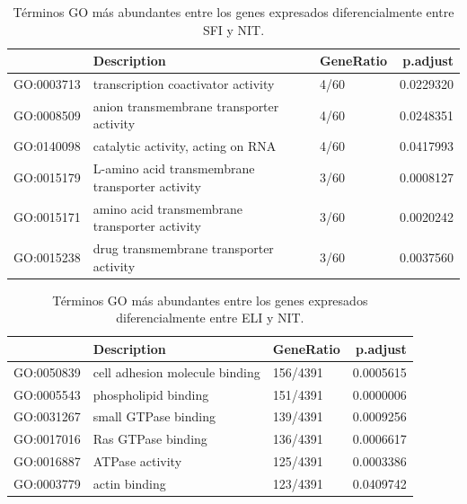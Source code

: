 \documentclass[
]{article}
\begin{document}
\begin{table}

\caption{\label{tab:unnamed-chunk-4}Términos GO más abundantes entre los genes expresados diferencialmente entre SFI y NIT.}
\centering
\begin{tabular}[t]{lllr}
\toprule
  & Description & GeneRatio & p.adjust\\
\midrule
GO:0003713 & transcription coactivator activity & 4/60 & 0.0229320\\
GO:0008509 & anion transmembrane transporter activity & 4/60 & 0.0248351\\
GO:0140098 & catalytic activity, acting on RNA & 4/60 & 0.0417993\\
GO:0015179 & L-amino acid transmembrane transporter activity & 3/60 & 0.0008127\\
GO:0015171 & amino acid transmembrane transporter activity & 3/60 & 0.0020242\\
\addlinespace
GO:0015238 & drug transmembrane transporter activity & 3/60 & 0.0037560\\
\bottomrule
\end{tabular}
\end{table}

\begin{table}

\caption{\label{tab:unnamed-chunk-5}Términos GO más abundantes entre los genes expresados diferencialmente entre ELI y NIT.}
\centering
\begin{tabular}[t]{lllr}
\toprule
  & Description & GeneRatio & p.adjust\\
\midrule
GO:0050839 & cell adhesion molecule binding & 156/4391 & 0.0005615\\
GO:0005543 & phospholipid binding & 151/4391 & 0.0000006\\
GO:0031267 & small GTPase binding & 139/4391 & 0.0009256\\
GO:0017016 & Ras GTPase binding & 136/4391 & 0.0006617\\
GO:0016887 & ATPase activity & 125/4391 & 0.0003386\\
\addlinespace
GO:0003779 & actin binding & 123/4391 & 0.0409742\\
\bottomrule
\end{tabular}
\end{table}
\end{document}
